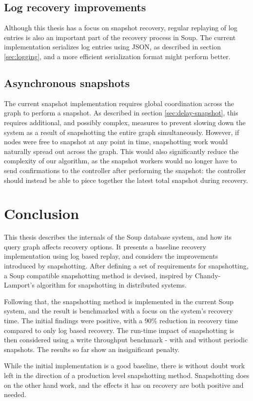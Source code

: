 \documentclass[b5paper]{report}
\begin{document}
\subsection{Log recovery improvements}
Although this thesis has a focus on snapshot recovery, regular replaying of log
entries is also an important part of the recovery process in Soup. The current
implementation serializes log entries using JSON, as described in section
\ref{sec:logging}, and a more efficient serialization format might perform
better.

\subsection{Asynchronous snapshots}
The current snapshot implementation requires global coordination across the
graph to perform a snapshot. As described in section \ref{sec:delay-snapshot},
this requires additional, and possibly complex, measures to prevent slowing down
the system as a result of snapshotting the entire graph simultaneously. However,
if nodes were free to snapshot at any point in time, snapshotting work would
naturally spread out across the graph. This would also significantly reduce the
complexity of our algorithm, as the snapshot workers would no longer have to
send confirmations to the controller after performing the snapshot: the
controller should instead be able to piece together the latest total snapshot
during recovery.

\section{Conclusion}
This thesis describes the internals of the Soup database system, and how its
query graph affects recovery options. It presents a baseline recovery
implementation using log based replay, and considers the improvements introduced
by snapshotting. After defining a set of requirements for snapshotting, a Soup
compatible snapshotting method is devised, inspired by Chandy-Lamport's
algorithm for snapshotting in distributed systems.

Following that, the snapshotting method is implemented in the current Soup
system, and the result is benchmarked with a focus on the system's recovery
time. The initial findings were positive, with a 90\% reduction in recovery
time compared to only log based recovery. The run-time impact of snapshotting is
then considered using a write throughput benchmark - with and without
periodic snapshots. The results so far show an insignificant penalty.

While the initial implementation is a good baseline, there is without doubt work
left in the direction of a production level snapshotting method. Snapshotting
does on the other hand work, and the effects it has on recovery are both
positive and needed.



\end{document}

